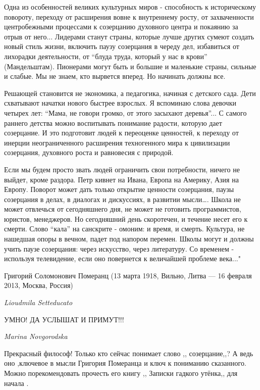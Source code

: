 Одна из особенностей великих культурных миров - способность к историческому
повороту, переходу от расширения вовне к внутреннему росту, от захваченности
центробежными процессами к созерцанию духовного центра и покаянию за отрыв от
него... Лидерами станут страны, которые лучше других сумеют создать новый стиль
жизни, включить паузу созерцания в череду дел, избавиться от лихорадки
деятельности, от \enquote{блуда труда, который у нас в крови} (Мандельштам). Пионерами
могут быть и большие и маленькие страны, сильные и слабые. Мы не знаем, кто
вырвется вперед. Но начинать должны все. 

Решающей становится не экономика, а педагогика, начиная с детского сада. Дети
схватывают начатки нового быстрее взрослых. Я вспоминаю слова девочки четырех
лет: \enquote{Мама, не говори громко, от этого засыхают деревья}... С самого
раннего детства можно воспитывать понимание радости, которую дает созерцание. И
это подготовит людей к переоценке ценностей, к переходу от инерции
неограниченного расширения техногенного мира к цивилизации созерцания,
духовного роста и равновесия с природой. 

Если мы будем просто звать людей ограничить свои потребности, ничего не выйдет,
кроме раздора. Петр кивнет на Ивана, Европа на Америку, Азия на Европу. Поворот
может дать только открытие ценности созерцания, паузы созерцания в делах, в
диалогах и дискуссиях, в развитии мысли….  Школа не может отвлечься от
сегодняшнего дня, не может не готовить программистов, юристов, менеджеров. Но
сегодняшний день скоротечен, и течение несет его к смерти. Слово \enquote{кала}
на санскрите - омоним: и время, и смерть. Культура, не нашедшая опоры в вечном,
падет под напором перемен.  Школы могут и должны учить паузе созерцания: через
искусство, через литературу. Со временем - используя телевидение, если оно
повернется к величайшей проблеме века..."

Григорий Соломонович Померанц (13 марта 1918, Вильно, Литва — 16 февраля 2013, Москва, Россия)

\emph{Lioudmila Setteducato}

УМНО! ДА УСЛЫШАТ И ПРИМУТ!!!

\emph{Marina Novgorodska}

Прекрасный философ! Только кто сейчас понимает слово ,, созерцание,,? А ведь
оно ,ключевое в мысли Григория Померанца и ключ к пониманию сказанного. Можно
порекомендовать прочесть его книгу ,, Записки гадкого утёнка,, для начала .
